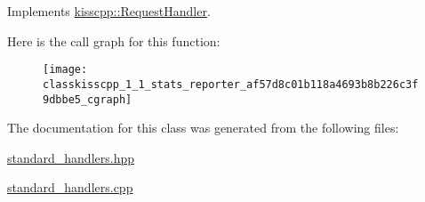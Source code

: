 Implements \hyperlink{classkisscpp_1_1_request_handler_a3606f772c07297826847a8e36226cdaa}{kisscpp\-::\-Request\-Handler}.



Here is the call graph for this function\-:\nopagebreak
\begin{figure}[H]
\begin{center}
\leavevmode
\texttt{[image: classkisscpp\_1\_1\_stats\_reporter\_af57d8c01b118a4693b8b226c3f9dbbe5\_cgraph]}
\end{center}
\end{figure}




The documentation for this class was generated from the following files\-:\begin{DoxyCompactItemize}
\item 
\hyperlink{standard__handlers_8hpp}{standard\-\_\-handlers.\-hpp}\item 
\hyperlink{standard__handlers_8cpp}{standard\-\_\-handlers.\-cpp}\end{DoxyCompactItemize}

